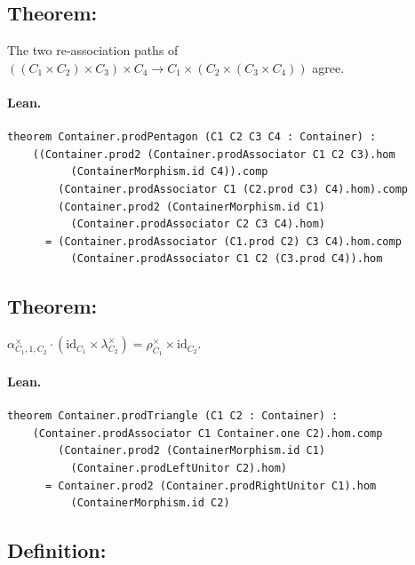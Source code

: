 \documentclass[11pt,a4paper]{article}
\begin{document}
\subsection{Theorem: }

\begin{thm}
The two re-association paths of
$((C_1 \times C_2) \times C_3) \times C_4 \to C_1 \times (C_2 \times (C_3 \times C_4))$
agree.
\end{thm}

\paragraph{Lean.}
\begin{lstlisting}[style=lean]
theorem Container.prodPentagon (C1 C2 C3 C4 : Container) :
    ((Container.prod2 (Container.prodAssociator C1 C2 C3).hom
          (ContainerMorphism.id C4)).comp
        (Container.prodAssociator C1 (C2.prod C3) C4).hom).comp
        (Container.prod2 (ContainerMorphism.id C1)
          (Container.prodAssociator C2 C3 C4).hom)
      = (Container.prodAssociator (C1.prod C2) C3 C4).hom.comp
          (Container.prodAssociator C1 C2 (C3.prod C4)).hom
\end{lstlisting}


\subsection{Theorem: }

\begin{thm}
$\alpha^\times_{C_1,1,C_2} \cdot (\mathrm{id}_{C_1} \times \lambda^\times_{C_2})
= \rho^\times_{C_1} \times \mathrm{id}_{C_2}$.
\end{thm}

\paragraph{Lean.}
\begin{lstlisting}[style=lean]
theorem Container.prodTriangle (C1 C2 : Container) :
    (Container.prodAssociator C1 Container.one C2).hom.comp
        (Container.prod2 (ContainerMorphism.id C1)
          (Container.prodLeftUnitor C2).hom)
      = Container.prod2 (Container.prodRightUnitor C1).hom
          (ContainerMorphism.id C2)
\end{lstlisting}


\subsection{Definition: }
\end{document}
